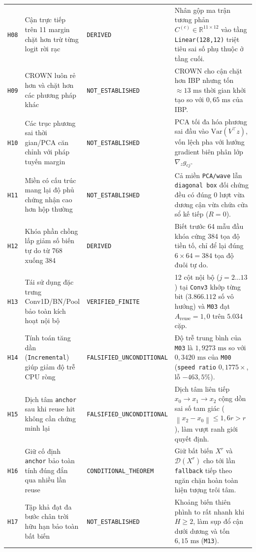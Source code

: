 \documentclass[11pt,a4paper]{article}
\newcommand{\R}{\mathbb{R}}
\newcommand{\norm}[1]{\left\lVert #1\right\rVert}
\newcommand{\code}[1]{{\small\ttfamily\nolinkurl{#1}}}
\newcommand{\Dset}{\mathcal{D}}
\theoremstyle{remark}
\begin{document}
{\begin{longtable}{@{}p{0.8cm}p{4.3cm}p{2.9cm}p{7.2cm}@{}}
\code{H08} & Cận trực tiếp trên 11 margin chặt hơn trừ từng logit rời rạc & \code{DERIVED} & Nhân gộp ma trận tương phản $C^{(c)} \in \R^{11 \times 12}$ vào tầng \code{Linear(128,12)} triệt tiêu sai số phụ thuộc ở tầng cuối. \\
\code{H09} & CROWN luôn rẻ hơn và chặt hơn các phương pháp khác & \code{NOT\_ESTABLISHED} & CROWN cho cận chặt hơn IBP nhưng tốn $\approx 13\text{ ms}$ thời gian khởi tạo so với $0,65\text{ ms}$ của IBP. \\
\code{H10} & Các trục phương sai thời gian/PCA căn chỉnh với pháp tuyến margin & \code{NOT\_ESTABLISHED} & PCA tối đa hóa phương sai đầu vào $\text{Var}(V^\top z)$, vốn lệch pha với hướng gradient biên phân lớp $\nabla_z g_{cj}$. \\
\code{H11} & Miền có cấu trúc mang lại độ phủ chứng nhận cao hơn hộp thường & \code{NOT\_ESTABLISHED} & Cả miền \code{PCA/wave} lẫn \code{diagonal box} đối chứng đều có đúng $0$ lượt vừa dương cận vừa chứa cửa sổ kế tiếp ($R=0$). \\
\code{H12} & Khóa phần chồng lấp giảm số biến tự do từ 768 xuống 384 & \code{DERIVED} & Biết trước 64 mẫu đầu khóa cứng 384 tọa độ tiền tố, chỉ để lại đúng $6 \times 64 = 384$ tọa độ đuôi tự do. \\
\code{H13} & Tái sử dụng đặc trưng Conv1D/BN/Pool bảo toàn kích hoạt nội bộ & \code{VERIFIED\_FINITE} & 12 cột nội bộ ($j=2\dots13$) tại \code{Conv3} khớp từng bit ($3.866.112$ số vô hướng) và \code{M03} đạt $A_{\text{reuse}}=1,0$ trên $5.034$ cặp. \\
\code{H14} & Tính toán tăng dần (\code{Incremental}) giúp giảm độ trễ CPU ròng & \code{FALSIFIED\_UNCONDITIONAL} & Độ trễ trung bình của \code{M03} là $1,9273\text{ ms}$ so với $0,3420\text{ ms}$ của \code{M00} (\code{speed ratio} $0,1775\times$, lỗ $-463,5\%$). \\
\code{H15} & Dịch tâm \code{anchor} sau khi reuse hit không cần chứng minh lại & \code{FALSIFIED\_UNCONDITIONAL} & Dịch tâm liên tiếp $x_0 \to x_1 \to x_2$ cộng dồn sai số tam giác ($\norm{x_2 - x_0} \le 1,6r > r$), làm vượt ranh giới quyết định. \\
\code{H16} & Giữ cố định \code{anchor} bảo toàn tính đúng đắn qua nhiều lần reuse & \code{CONDITIONAL\_THEOREM} & Giữ bất biến $X^r$ và $\Dset(X^r)$ cho tới lần \code{fallback} tiếp theo ngăn chặn hoàn toàn hiện tượng trôi tâm. \\
\code{H17} & Tập khả đạt đa bước chân trời hữu hạn bảo toàn bất biến & \code{NOT\_ESTABLISHED} & Khoảng biến thiên phình to rất nhanh khi $H \ge 2$, làm sụp đổ cận dưới dương và tốn $6,15\text{ ms}$ (\code{M13}). \\

\end{longtable}}
\end{document}

